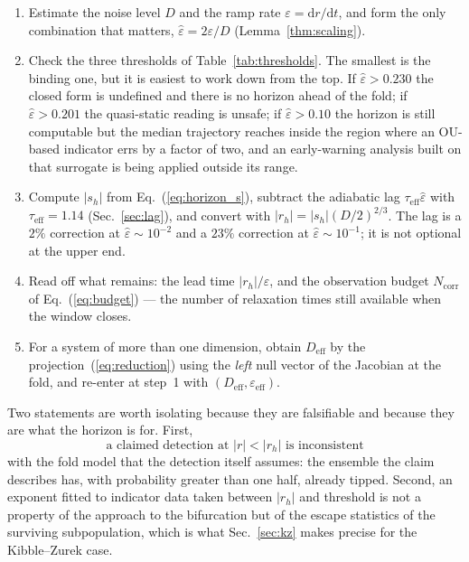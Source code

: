 \documentclass[%
 aip,
 cha,
 amsmath,amssymb,
 reprint,
 superscriptaddress,
 floatfix,
]{revtex4-2}
\newcommand{\dd}{\mathrm{d}}
\newcommand{\Sig}{\hat\varepsilon}
\begin{document}
\begin{enumerate}
\itemsep2pt
\item Estimate the noise level $D$ and the ramp rate $\varepsilon=\dd r/\dd t$,
  and form the only combination that matters, $\Sig=2\varepsilon/D$
  (Lemma~\ref{thm:scaling}).

\item Check the three thresholds of Table~\ref{tab:thresholds}.  The smallest
  is the binding one, but it is easiest to work down from the top.  If $\Sig>0.230$ the closed form is undefined and there is no
  horizon ahead of the fold; if $\Sig>0.201$ the quasi-static reading is unsafe;
  if $\Sig>0.10$ the horizon is still computable but the median trajectory
  reaches inside the region where an OU-based indicator errs by a factor of two,
  and an early-warning analysis built on that surrogate is being applied outside
  its range.

\item Compute $|s_h|$ from Eq.~(\ref{eq:horizon_s}), subtract the adiabatic lag
  $\tau_{\mathrm{eff}}\Sig$ with $\tau_{\mathrm{eff}}=1.14$
  (Sec.~\ref{sec:lag}), and convert with $|r_h|=|s_h|(D/2)^{2/3}$.  The lag is a
  $2\%$ correction at $\Sig\sim10^{-2}$ and a $23\%$ correction at
  $\Sig\sim10^{-1}$; it is not optional at the upper end.

\item Read off what remains: the lead time $|r_h|/\varepsilon$, and the
  observation budget $N_{\mathrm{corr}}$ of Eq.~(\ref{eq:budget}) --- the number
  of relaxation times still available when the window closes.

\item For a system of more than one dimension, obtain $D_{\mathrm{eff}}$ by the
  projection~(\ref{eq:reduction}) using the \emph{left} null vector of the
  Jacobian at the fold, and re-enter at step~1 with
  $(D_{\mathrm{eff}},\varepsilon_{\mathrm{eff}})$.
\end{enumerate}

Two statements are worth isolating because they are falsifiable and because they
are what the horizon is for.  First,
\begin{equation}
\label{eq:falsifiable}
\text{a claimed detection at }|r|<|r_h|\text{ is inconsistent}
\end{equation}
with the fold model that the detection itself assumes: the ensemble the claim
describes has, with probability greater than one half, already tipped.  Second,
an exponent fitted to indicator data taken between $|r_h|$ and threshold is not
a property of the approach to the bifurcation but of the escape statistics of
the surviving subpopulation, which is what Sec.~\ref{sec:kz} makes precise for
the Kibble--Zurek case.
\end{document}

